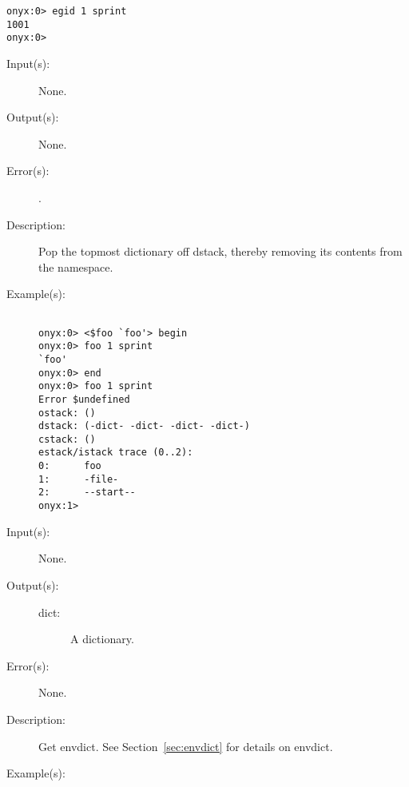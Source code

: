 \begin{description}
\begin{description}
\begin{verbatim}
onyx:0> egid 1 sprint
1001
onyx:0>
		\end{verbatim}
	\end{description}
\label{systemdict:end}
\item[{\onyxop{--}{end}{--}}: ]
	\begin{description}\item[]
	\item[Input(s): ] None.
	\item[Output(s): ] None.
	\item[Error(s): ]
		\begin{description}\item[]
		\item[.]
		\end{description}
	\item[Description: ]
		Pop the topmost dictionary off dstack, thereby removing its
		contents from the namespace.
	\item[Example(s): ]\begin{verbatim}

onyx:0> <$foo `foo'> begin
onyx:0> foo 1 sprint
`foo'
onyx:0> end
onyx:0> foo 1 sprint
Error $undefined
ostack: ()
dstack: (-dict- -dict- -dict- -dict-)
cstack: ()
estack/istack trace (0..2):
0:      foo
1:      -file-
2:      --start--
onyx:1>
		\end{verbatim}
	\end{description}
\label{systemdict:envdict}
\item[{\onyxop{--}{envdict}{dict}}: ]
	\begin{description}\item[]
	\item[Input(s): ] None.
	\item[Output(s): ]
		\begin{description}\item[]
		\item[dict: ]
			A dictionary.
		\end{description}
	\item[Error(s): ] None.
	\item[Description: ]
		Get envdict.  See Section~\ref{sec:envdict} for details on
		envdict.
	\item[Example(s): ]\begin{verbatim}


\end{verbatim}
\end{description}
\end{description}

